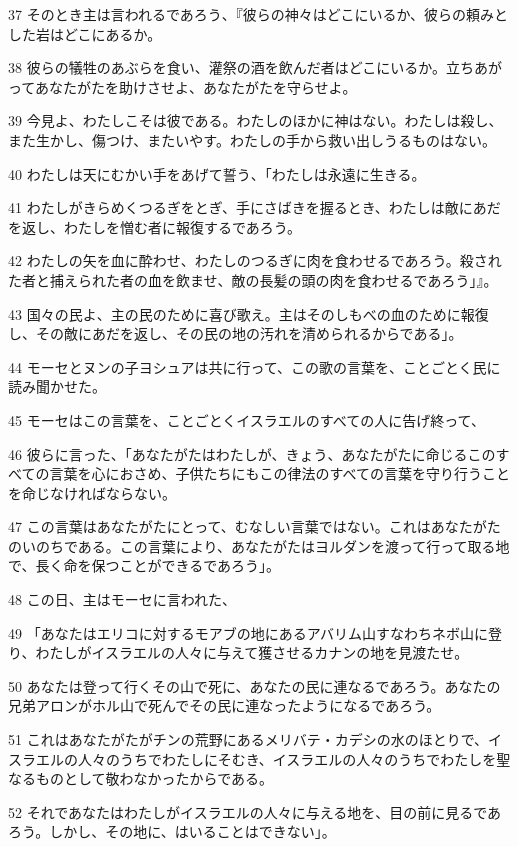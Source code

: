 \par 37 そのとき主は言われるであろう、『彼らの神々はどこにいるか、彼らの頼みとした岩はどこにあるか。
\par 38 彼らの犠牲のあぶらを食い、灌祭の酒を飲んだ者はどこにいるか。立ちあがってあなたがたを助けさせよ、あなたがたを守らせよ。
\par 39 今見よ、わたしこそは彼である。わたしのほかに神はない。わたしは殺し、また生かし、傷つけ、またいやす。わたしの手から救い出しうるものはない。
\par 40 わたしは天にむかい手をあげて誓う、「わたしは永遠に生きる。
\par 41 わたしがきらめくつるぎをとぎ、手にさばきを握るとき、わたしは敵にあだを返し、わたしを憎む者に報復するであろう。
\par 42 わたしの矢を血に酔わせ、わたしのつるぎに肉を食わせるであろう。殺された者と捕えられた者の血を飲ませ、敵の長髪の頭の肉を食わせるであろう」』。
\par 43 国々の民よ、主の民のために喜び歌え。主はそのしもべの血のために報復し、その敵にあだを返し、その民の地の汚れを清められるからである」。
\par 44 モーセとヌンの子ヨシュアは共に行って、この歌の言葉を、ことごとく民に読み聞かせた。
\par 45 モーセはこの言葉を、ことごとくイスラエルのすべての人に告げ終って、
\par 46 彼らに言った、「あなたがたはわたしが、きょう、あなたがたに命じるこのすべての言葉を心におさめ、子供たちにもこの律法のすべての言葉を守り行うことを命じなければならない。
\par 47 この言葉はあなたがたにとって、むなしい言葉ではない。これはあなたがたのいのちである。この言葉により、あなたがたはヨルダンを渡って行って取る地で、長く命を保つことができるであろう」。
\par 48 この日、主はモーセに言われた、
\par 49 「あなたはエリコに対するモアブの地にあるアバリム山すなわちネボ山に登り、わたしがイスラエルの人々に与えて獲させるカナンの地を見渡たせ。
\par 50 あなたは登って行くその山で死に、あなたの民に連なるであろう。あなたの兄弟アロンがホル山で死んでその民に連なったようになるであろう。
\par 51 これはあなたがたがチンの荒野にあるメリバテ・カデシの水のほとりで、イスラエルの人々のうちでわたしにそむき、イスラエルの人々のうちでわたしを聖なるものとして敬わなかったからである。
\par 52 それであなたはわたしがイスラエルの人々に与える地を、目の前に見るであろう。しかし、その地に、はいることはできない」。

